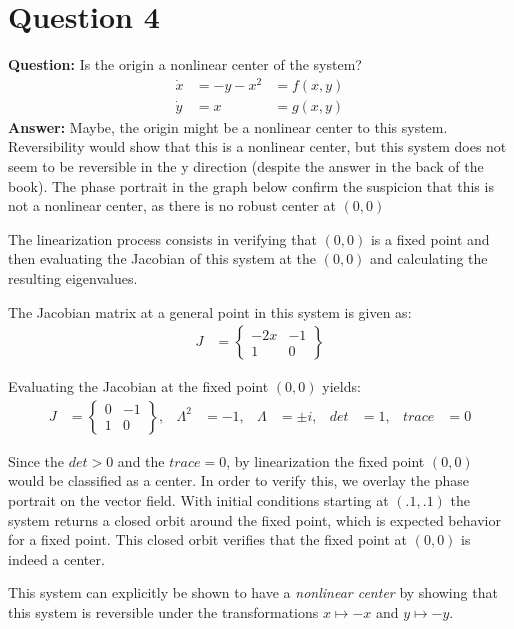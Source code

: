\documentclass[12pt]{article}
\newenvironment{myenv}{\begin{adjustwidth}{1cm}{}}{\end{adjustwidth}}
\begin{document}
\section*{Question 4}
\begin{myenv}
\textbf{Question:} Is the origin a nonlinear center of the system?
\begin{alignat*}{3}
\dot{x} &= -y-x^2 &= f(x,y)\\
\dot{y} &= x &= g(x,y)
\end{alignat*}
\textbf{Answer:} Maybe, the origin might be a nonlinear center to this system. Reversibility would show that this is a nonlinear center, but this system does not seem to be reversible in the y direction (despite the answer in the back of the book). The phase portrait in the graph below confirm the suspicion that this is not a nonlinear center, as there is no robust center at $(0,0)$

The linearization process consists in verifying that $(0,0)$ is a fixed point and then evaluating the Jacobian of this system at the $(0,0)$ and calculating the resulting eigenvalues.

The Jacobian matrix at a general point in this system is given as:
\begin{align*}
	J &= 
	\begin{Bmatrix}
	-2x & -1 \\
	1 & 0
	\end{Bmatrix}
\end{align*}

Evaluating the Jacobian at the fixed point $(0,0)$ yields:
\begin{align*}
	J &= 
	\begin{Bmatrix}
	0 & -1 \\
	1 & 0
	\end{Bmatrix}, 	&\Lambda^2 &= -1,	&\Lambda &= \pm i, &det &= 1, &trace &= 0
\end{align*}

Since the $det>0$ and the $trace=0$, by linearization the fixed point $(0,0)$ would be classified as a center. In order to verify this, we overlay the phase portrait on the vector field. With initial conditions starting at $(.1,.1)$ the system returns a closed orbit around the fixed point, which is expected behavior for a fixed point. This closed orbit verifies that the fixed point at $(0,0)$ is indeed a center.

This system can explicitly be shown to have a \emph{nonlinear center} by showing that this system is reversible under the transformations $x \mapsto -x$ and $y \mapsto -y$.


\end{myenv}
\end{document}
